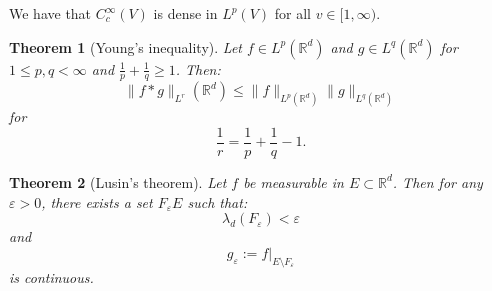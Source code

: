 \documentclass{article}
\newtheorem{theorem}{Theorem}
\theoremstyle{definition}
\numberwithin{theorem}{section}
\numberwithin{equation}{section}
\begin{document}
We have that $C^\infty_c(V)$ is dense in $L^p(V)$ for all $v \in [1, \infty)$. 

\begin{theorem}[Young's inequality]
	Let $ f \in L^p(\mathbb{R}^d)$ and $g \in L^q(\mathbb{R}^d)$ for $1 \leq p , q < \infty$ and $\frac{1}{p} + \frac{1}{q} \geq 1$. Then:
	\begin{equation}
		\| f \ast g \|_{L^r}(\mathbb{R}^d) \leq \| f \|_{L^p(\mathbb{R}^d)}\| g \|_{L^q(\mathbb{R}^d)}
	\end{equation}
	for 
	\begin{equation}
		\frac{1}{r} = \frac{1}{p} + \frac{1}{q} - 1.
	\end{equation}
	
\end{theorem}

\begin{theorem}[Lusin's theorem]
	Let $f$ be measurable in $E \subset \mathbb{R}^d$. Then for any $\varepsilon > 0$, there exists a set $F_\varepsilon E$ such that:
	\begin{equation}
		\lambda_d(F_\varepsilon) < \varepsilon
	\end{equation}
	and
	\begin{equation}
		g_\varepsilon := f|_{E\setminus F_\varepsilon}
	\end{equation}
	is continuous. 
\end{theorem}
\end{document}

